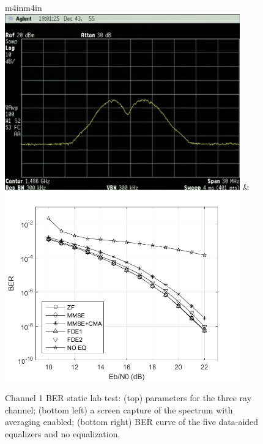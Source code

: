 \begin{figure}
\begin{center}
\begin{tabular}{m{4in}m{4in}}
\\[54pt]
\includegraphics[width=4in]{figures/eq_GPUimplementation/BER1.jpg}
&
\includegraphics[width=4in]{figures/myPNGs/BER1.png}
\end{tabular}
\end{center}
\caption{Channel 1 BER static lab test:
(top) parameters for the three ray channel;
(bottom left) a screen capture of the spectrum with averaging enabled;
(bottom right) BER curve of the five data-aided equalizers and no equalization.}
\label{fig:BER1}
\end{figure}

